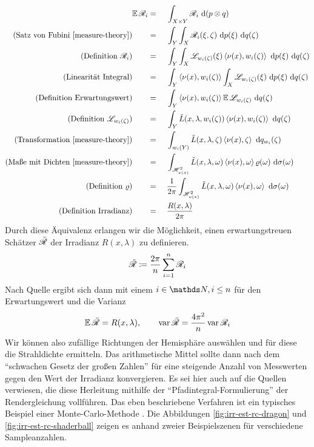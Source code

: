 		\begin{alignat*}{3}
			\expect \e{R}_i &=&&\ \integral{X\times Y}{}{\e{R}_i}{(p\otimes q)} \\
			\text{(Satz von Fubini \cite[S.~175~f]{measure-theory})}\qquad &=&&\ \integral{Y}{}{ \integral{X}{}{ \e{R}_i(\xi,\zeta) }{p(\xi)} }{q(\zeta)} \\
			\text{(Definition $\e{R}_i$)}\qquad &=&&\ \integral{Y}{}{ \integral{X}{}{ \e{L}_{w_i(\zeta)}(\xi) \dotp{\nu(x)}{w_i(\zeta)} }{p(\xi)} }{q(\zeta)} \\
			\text{(Linearität Integral)}\qquad &=&&\ \integral{Y}{}{ \dotp{\nu(x)}{w_i(\zeta)} \integral{X}{}{ \e{L}_{w_i(\zeta)}(\xi)  }{p(\xi)} }{q(\zeta)} \\
			\text{(Definition Erwartungswert)}\qquad&=&&\ \integral{Y}{}{ \dotp{\nu(x)}{w_i(\zeta)}\expect \e{L}_{w_i(\zeta)} }{q(\zeta)} \\
			\text{(Definition $\e{L}_{w_i(\zeta)}$)}\qquad&=&&\ \integral{Y}{}{ \tilde{L}(x,\lambda,w_i(\zeta)) \dotp{\nu(x)}{w_i(\zeta)}}{q(\zeta)} \\
			\text{(Transformation \cite[S.~191~f]{measure-theory})}\qquad &=&&\ \integral{w_i(Y)}{}{ \tilde{L}(x,\lambda,\zeta) \dotp{\nu(x)}{\zeta}}{q_{w_i}(\zeta)} \\
			\text{(Maße mit Dichten \cite[S.~127~f]{measure-theory})}\qquad &=&&\ \integral{\shs{\nu(x)}}{}{\tilde{L}(x,\lambda,\omega)\dotp{\nu(x)}{\omega}\varrho(\omega)}{\sigma(\omega)} \\
			\text{(Definition $\varrho$)}\qquad&=&&\ \frac{1}{2\pi} \integral{\shs{\nu(x)}}{}{\tilde{L}(x,\lambda,\omega)\dotp{\nu(x)}{\omega}}{\sigma(\omega)} \\
			\text{(Definition Irradianz)}\qquad&=&&\ \frac{R(x,\lambda)}{2\pi}
		\end{alignat*}
		Durch diese Äquivalenz erlangen wir die Möglichkeit, einen erwartungstreuen Schätzer $\bar{\mathscr{R}}$ der Irradianz $R(x,\lambda)$ zu definieren.
		\[
			\bar{\mathscr{R}} \coloneqq \frac{2\pi}{n}\sum_{i=1}^n \mathscr{R}_i
		\]
		Nach Quelle \cite[S.~249~ff]{prob-theory} ergibt sich dann mit einem $i\in\SN,i\leq n$ für den Erwartungswert und die Varianz
		\[
			\operatorname{\mathbb{E}} \bar{\mathscr{R}} = R(x,\lambda),\qquad \operatorname{var} \bar{\mathscr{R}} = \frac{4\pi^2}{n}\operatorname{var} \mathscr{R}_i
		\]
		Wir können also zufällige Richtungen der Hemisphäre auswählen und für diese die Strahldichte ermitteln.
		Das arithmetische Mittel sollte dann nach dem \enquote{schwachen Gesetz der großen Zahlen} \cite[S.~254]{prob-theory} für eine steigende Anzahl von Messwerten gegen den Wert der Irradianz konvergieren.
		Es sei hier auch auf die Quellen \cite{kajiya-lte,pbrt3,veach-thesis} verwiesen, die diese Herleitung mithilfe der \enquote{Pfadintegral-Formulierung} der Rendergleichung vollführen.
		Das eben beschriebene Verfahren ist ein typisches Beispiel einer Monte-Carlo-Methode \cite{monte-carlo-method}.
		Die Abbildungen \ref{fig:irr-est-rc-dragon} und \ref{fig:irr-est-rc-shaderball} zeigen es anhand zweier Beispielszenen für verschiedene Sampleanzahlen.

